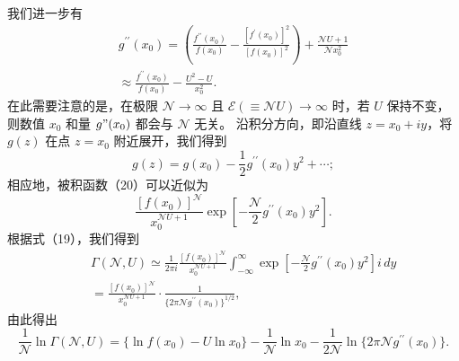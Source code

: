 我们进一步有
\begin{equation}\tag{3.2.24}\label{eq:3.2.24}
\begin{array}{r} { g ^{\prime \prime} ( x _ { 0 } ) = \left( \frac { f ^{\prime \prime} ( x _ { 0 } ) } { f ( x _ { 0 } ) } - \frac { [ f ^{\prime} ( x _ { 0 } ) ] ^{2} } { [ f ( x _ { 0 } ) ] ^{2} } \right) + \frac { \mathcal { N } U + 1 } { \mathcal { N } x _ { 0 } ^{2} } } \\{ \approx \frac { f ^{\prime \prime} ( x _ { 0 } ) } { f ( x _ { 0 } ) } - \frac { U ^{2} - U } { x _ { 0 } ^{2} } . } \end{array}
\end{equation}
在此需要注意的是，在极限 \(\mathcal{N} \to \infty\) 且 \(\mathcal{E}(\equiv \mathcal{N} U) \to \infty\) 时，若 \(U\) 保持不变，则数值 \(x_0\) 和量 \(g"(x_0)\) 都会与 \(\mathcal{N}\) 无关。
沿积分方向，即沿直线 \(z=x_0+iy\)，将 \(g(z)\) 在点 \(z=x_0\) 附近展开，我们得到
\begin{equation}\tag{3.2.25}\label{eq:3.2.25}
g ( z ) = g ( x _ { 0 } ) - \frac { 1 } { 2 } g ^{\prime \prime} ( x _ { 0 } ) y ^{2} + \cdots ;
\end{equation}
相应地，被积函数（20）可以近似为
\begin{equation}\tag{3.2.26}\label{eq:3.2.26}
\frac { [ f ( x _ { 0 } ) ] ^{\mathcal { N} } } { x _ { 0 } ^{\mathcal { N} U + 1 } } \exp \left[ - \frac { \mathcal { N } } { 2 } g ^{\prime \prime} ( x _ { 0 } ) y ^{2} \right] .
\end{equation}
根据式（19），我们得到
\begin{equation}\tag{3.2.27}\label{eq:3.2.27}
\begin{array}{rlr} & { } & { \Gamma ( \mathcal { N } , U ) \simeq \frac { 1 } { 2 \pi i } \frac { [ f ( x _ { 0 } ) ] ^{\mathcal { N} } } { x _ { 0 } ^{\mathcal { N} U + 1 } } \int _ { - \infty } ^{\infty} \exp \left[ - \frac { \mathcal { N } } { 2 } g ^{\prime \prime} ( x _ { 0 } ) y ^{2} \right] i \, d y } \\& { } & { = \frac { [ f ( x _ { 0 } ) ] ^{\mathcal { N} } } { x _ { 0 } ^{\mathcal { N} U + 1 } } \cdot \frac { 1 } { \{ 2 \pi \mathcal { N } g ^{\prime \prime} ( x _ { 0 } ) \} ^{1 / 2} } , } \end{array}
\end{equation}
由此得出
\begin{equation}\tag{3.2.28}\label{eq:3.2.28}
\frac { 1 } { \mathcal { N } } \ln \Gamma ( \mathcal { N } , U ) = \{ \ln f ( x _ { 0 } ) - U \ln x _ { 0 } \} - \frac { 1 } { \mathcal { N } } \ln x _ { 0 } - \frac { 1 } { 2 \mathcal { N } } \ln \{ 2 \pi \mathcal { N } g ^{\prime \prime} ( x _ { 0 } ) \} .
\end{equation}
